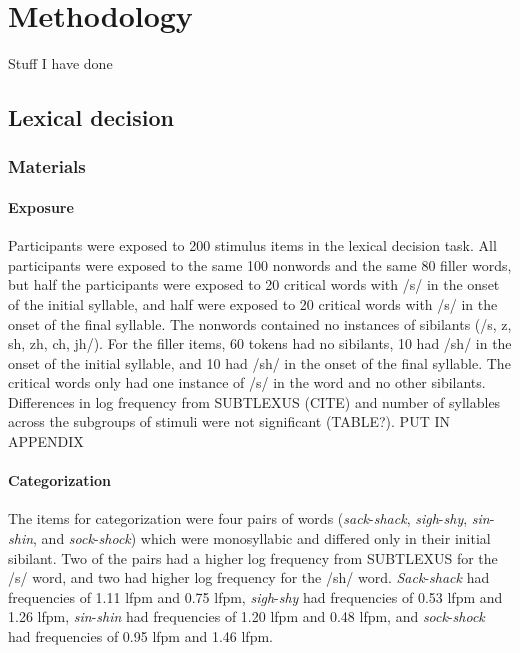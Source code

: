 
\chapter{Methodology}

Stuff I have done



\section{Lexical decision}

\subsection{Materials}

\subsubsection{Exposure}

Participants were exposed to 200 stimulus items in the lexical decision task.  All participants were exposed to the same 100 nonwords and the same 80 filler words, but half the participants were exposed to 20 critical words with /s/ in the onset of the initial syllable, and half were exposed to 20 critical words with /s/ in the onset of the final syllable.  The nonwords contained no instances of sibilants (/s, z, sh, zh, ch, jh/).  For the filler items, 60 tokens had no sibilants, 10 had /sh/ in the onset of the initial syllable, and 10 had /sh/ in the onset of the final syllable.  The critical words only had one instance of /s/ in the word and no other sibilants.  Differences in log frequency from SUBTLEXUS (CITE) and number of syllables across the subgroups of stimuli were not significant (TABLE?). PUT IN APPENDIX


\subsubsection{Categorization}

The items for categorization were four pairs of words (\emph{sack}-\emph{shack}, \emph{sigh}-\emph{shy}, \emph{sin}-\emph{shin}, and \emph{sock}-\emph{shock}) which were monosyllabic and differed only in their initial sibilant.  Two of the pairs had a higher log frequency from SUBTLEXUS for the /s/ word, and two had higher log frequency for the /sh/ word.  \emph{Sack}-\emph{shack} had frequencies of 1.11 lfpm and 0.75 lfpm, \emph{sigh}-\emph{shy} had frequencies of 0.53 lfpm and 1.26 lfpm, \emph{sin}-\emph{shin} had frequencies of 1.20 lfpm and 0.48 lfpm, and \emph{sock}-\emph{shock} had frequencies of 0.95 lfpm and 1.46 lfpm.
	


